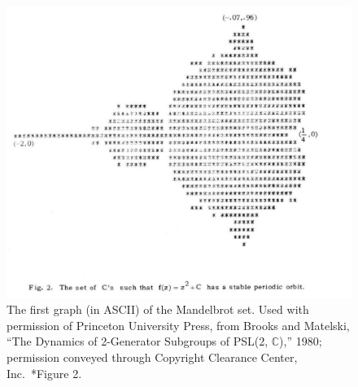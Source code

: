 \documentclass{notices}
\begin{document}
\begin{figure}
    \centering
    \includegraphics[width = 1.\linewidth]{images/brooksmatelski-mandelbrot.jpg}
    \caption{The first graph (in ASCII) of the Mandelbrot set. Used with permission of Princeton University Press, from Brooks and Matelski, ``The Dynamics of 2-Generator Subgroups of PSL(2, $\mathbb{C}$),'' 1980; permission conveyed through Copyright Clearance Center, Inc.~\cite{BM81}*{Figure 2}.
    }
    \label{Fig:Mandelbrot}
\end{figure}
\end{document}

